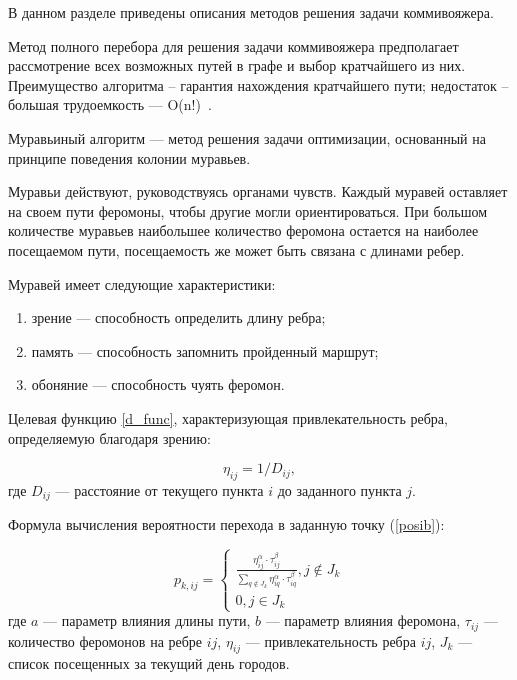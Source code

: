 \label{cha:A}
В данном разделе приведены описания методов решения задачи коммивояжера.

Метод полного перебора для решения задачи коммивояжера предполагает рассмотрение всех возможных путей в графе и выбор кратчайшего из них.
Преимущество алгоритма -- гарантия нахождения кратчайшего пути; недостаток -- большая трудоемкость — O(n!)~\cite{ulianov}.


Муравьиный алгоритм \cite{shtovba} --- метод решения задачи оптимизации, основанный на принципе поведения колонии муравьев.

Муравьи действуют, руководствуясь органами чувств. 
Каждый муравей оставляет на своем пути феромоны, чтобы другие могли ориентироваться. 
При большом количестве муравьев наибольшее количество феромона остается на наиболее посещаемом пути, посещаемость же может быть связана с длинами ребер.

Муравей имеет следующие характеристики:
\begin{enumerate}[label=\arabic*)]
	\item зрение --- способность определить длину ребра;
	\item память --- способность запомнить пройденный маршрут;
	\item обоняние --- способность чуять феромон.
\end{enumerate}


Целевая функцию \eqref{d_func}, характеризующая привлекательность ребра, определяемую благодаря зрению:

\begin{equation}
	\label{d_func}
	\eta_{ij} = 1 / D_{ij},
\end{equation}
где $D_{ij}$ — расстояние от текущего пункта $i$ до заданного пункта $j$.


Формула вычисления вероятности перехода в заданную точку (\eqref{posib}):

\begin{equation}
	\label{posib}
	p_{k,ij} = \begin{cases}
		\frac{\eta_{ij}^{\alpha}\cdot\tau_{ij}^{\beta}}{\sum_{q\notin J_k} \eta^\alpha_{iq}\cdot\tau^\beta_{iq}}, j \notin J_k \\
		0, j \in J_k
	\end{cases}
\end{equation}
где $a$ --- параметр влияния длины пути, $b$ --- параметр влияния феромона, $\tau_{ij}$ --- количество феромонов на ребре $ij$, $\eta_{ij}$ --- привлекательность ребра $ij$, $J_k$ --- список посещенных за текущий день городов.

